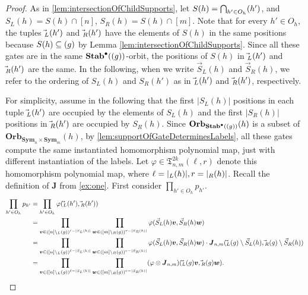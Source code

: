 \documentclass[10pt,a4paper]{article}
\theoremstyle{definition}
\theoremstyle{plain}
\theoremstyle{remark}
\renewcommand{\phi}{\varphi}
\newcommand{\Sym}{\mathbf{Sym}}
\newcommand{\Stab}{\mathbf{Stab}}
\newcommand{\StabP}{\Stab^{\bullet}}
\newcommand{\Orb}{\mathbf{Orb}}
\let\sup\relax
\DeclareMathOperator{\sup}{sup}
\begin{document}
 	\begin{proof}
 		As in \cref{lem:intersectionOfChildSupports}, let $S(h) = \bigcap_{h' \in O_h} \sup(h')$, and $S_L(h) = S(h) \cap [n]$, $S_R(h) = S(h) \cap [m]$.
  		Note that for every $h' \in O_h$, the tuples $\vec{\sup}_L(h')$ and $\vec{\sup}_R(h')$ have the elements of $S(h)$ in the same positions because $S(h) \subseteq \sup(g)$ by Lemma \ref{lem:intersectionOfChildSupports}. Since all these gates are in the same $\StabP(\sup(g))$-orbit, the positions of $S(h)$ in $\vec{\sup}_L(h')$ and $\vec{\sup}_R(h')$ are the same. In the following, when we write $\vec{S}_L(h)$ and $\vec{S}_R(h)$, we refer to the ordering of $S_L(h)$ and $S_R(h')$ as in $\vec{\sup}_L(h')$ and $\vec{\sup}_R(h')$, respectively. 
 		
		For simplicity, assume in the following that the first $|S_L(h)|$ positions in each tuple $\vec{\sup}_L(h')$ are occupied by the elements of $S_L(h)$ and the first $|S_R(h)|$ positions in $\vec{\sup}_R(h')$ are occupied by $S_R(h)$. 
 		Since $\Orb_{\StabP(\sup(g))}(h)$ is a subset of $\Orb_{\Sym_n \times \Sym_m}(h)$, by \cref{lem:supportOfGateDeterminesLabels}, all these gates compute the same instantiated homomorphism polynomial map, just with different instantiation of the labels.
 		Let $\phi \in \mathfrak{T}_{n,m}^{2k}(\ell , r)$ denote this homomorphism polynomial map, where $\ell = |\sup_L(h)|, r = |\sup_R(h)|$. 
 		Recall the definition of $\boldsymbol{J}$ from \cref{ex:one}.
 		First consider $\prod_{h' \in O_h} p_{h'}$. 
 		\begin{align*}
 		 \prod_{h' \in O_h} p_{h'} 
 		 &= \prod_{h' \in O_h}  \phi(\vec{\sup}_L(h'), \vec{\sup}_R(h')) \\
 		 &= \prod_{\boldsymbol{v} \in ([n] \setminus \sup_L(g))^{\ell - |S_L(h)|}} \prod_{\boldsymbol{w} \in ([m] \setminus \sup_R(g))^{r - |S_R(h)|}} \phi(\vec{S}_L(h) \boldsymbol{v}, \vec{S}_R(h) \boldsymbol{w})  \\
 		 &= \prod_{\boldsymbol{v} \in ([n] \setminus \sup_L(g))^{\ell - |S_L(h)|}} \prod_{\boldsymbol{w} \in ([m] \setminus \sup_R(g))^{r - |S_R(h)|}} \phi(\vec{S}_L(h) \boldsymbol{v}, \vec{S}_R(h) \boldsymbol{w})
 		  \cdot \boldsymbol{J}_{n,m}(\vec{\sup}_L(g) \setminus \vec{S}_L(h), \vec{\sup}_R(g) \setminus \vec{S}_R(h))\\
 		  &= \prod_{\boldsymbol{v} \in ([n] \setminus \sup_L(g))^{\ell - |S_L(h)|}} \prod_{\boldsymbol{w} \in ([m] \setminus \sup_R(g))^{r - |S_R(h)|}} (\phi \otimes \boldsymbol{J}_{n,m})(\vec{\sup}_L(g) \boldsymbol{v}, \vec{\sup}_R(g) \boldsymbol{w}). 

\end{align*}
\end{proof}
\end{document}
